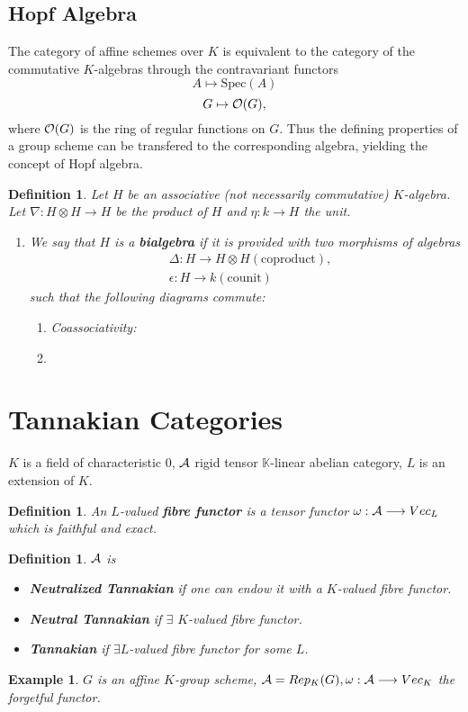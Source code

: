 \documentclass[11pt]{article}
\newtheorem{dfn}[thm]{Definition}
\newtheorem{ex}[thm]{Example}
\newcommand{\bbk}{\mathbb K}
\newcommand{\cala}{{\cal A}}
\newcommand{\calo}{{\cal O}}
\newcommand{\lrta}{\longrightarrow}
\begin{document}
\subsection{Hopf Algebra}
The category of affine schemes over $K$ is equivalent to the category of the commutative $K$-algebras through the contravariant functors
$$
A\mapsto \text{Spec}(A)
$$
$$
G\mapsto \calo(G),
$$
where $\calo(G)$ is the ring of regular functions on $G$. Thus the defining properties of a group scheme can be transfered to the corresponding algebra, yielding the concept of Hopf algebra.

\begin{dfn}
Let $H$ be an associative (not necessarily commutative) $K$-algebra. Let $\nabla:H\otimes H\lrta H$ be the product of $H$ and $\eta :k\lrta H$ the unit.
\begin{enumerate}[label=(\arabic*)]
\item We say that  $H$ is a \textbf{bialgebra} if it is provided with two morphisms of algebras
$$
\begin{aligned}
& \Delta:H\lrta H\otimes H(\text{coproduct}),\\
& \epsilon: H\lrta k(\text{counit})
\end{aligned}
$$
such that the following diagrams commute:
\begin{enumerate}[label=(\alph*)]
\item Coassociativity:
\item
\end{enumerate}
\end{enumerate}
\end{dfn}

\section{Tannakian Categories}
$K$ is a field of characteristic 0, $\cala$ rigid tensor $\bbk$-linear abelian category, $L$ is an extension of $K$.
\begin{dfn}
An $L$-valued \textbf{fibre functor }is a tensor functor $\omega:\cala\lrta Vec_L$ which is faithful and exact.
\end{dfn}
\begin{dfn}
$\cala$ is 
\begin{itemize}
    \item \textbf{Neutralized Tannakian} if one can  endow it with a $K$-valued fibre functor.
    \item \textbf{Neutral Tannakian} if $\exists$ $K$-valued fibre functor.
    \item \textbf{Tannakian } if $\exists L$-valued fibre functor for some $L$.
\end{itemize}
\end{dfn}
\begin{ex}
$G$ is an affine $K$-group scheme, $\cala=Rep_K(G),\omega:\cala\lrta Vec_K$ the forgetful functor.
\end{ex}
\end{document}
